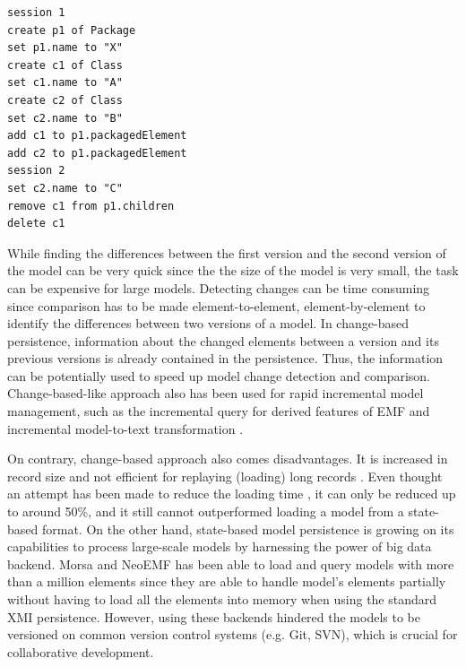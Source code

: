 \documentclass[10pt,conference]{IEEEtran}
\begin{document}
\begin{lstlisting}[style=eol,caption={The text change-based persistence of both versions in List. \ref{lst:xmimodel1} and \ref{lst:xmimodel2}. The visual illustration can be been in Fig. \ref{fig:illustration_cbp}.},label=lst:cbpmodel]
session 1
create p1 of Package
set p1.name to "X"  
create c1 of Class
set c1.name to "A"
create c2 of Class
set c2.name to "B"
add c1 to p1.packagedElement   
add c2 to p1.packagedElement
session 2
set c2.name to "C"
remove c1 from p1.children   
delete c1
\end{lstlisting}





While finding the differences between the first version and the second version of the model can be very quick since the the size of the model is very small, the task can be expensive for large models. Detecting changes can be time consuming since comparison has to be made element-to-element, element-by-element to identify the differences between two versions of a model. In change-based persistence, information about the changed elements between a version and its previous versions is already contained in the persistence. Thus, the information can be potentially used to speed up model change detection and comparison. Change-based-like approach also has been used for rapid incremental model management, such as the incremental query for derived features of EMF \cite{DBLP:conf/ecmdafa/RathHV12} and incremental model-to-text transformation \cite{DBLP:conf/ecmdafa/OgunyomiRK15}.

On contrary, change-based approach also comes disadvantages. It is increased in record size \cite{DBLP:journals/entcs/RobbesL07,DBLP:conf/edoc/KoegelHLHD10} and not efficient for replaying (loading)  long records \cite{mens2002state}. Even thought an attempt has been made to reduce the loading time \cite{yohannis2018towards}, it can only be reduced up to around 50\%, and it still cannot outperformed loading a model from a state-based format. On the other hand, state-based model persistence is growing on its capabilities to process large-scale models by harnessing the power of big data backend. Morsa \cite{DBLP:conf/models/Espinazo-PaganCM11} and NeoEMF \cite{daniel2016neoemf} has been able to load and query models with more than a million elements since they are able to handle model's elements partially without having to load all the elements into memory when using the standard XMI persistence. However, using these backends hindered the models to be versioned on common version control systems (e.g. Git, SVN), which is crucial for collaborative development.
\end{document}
